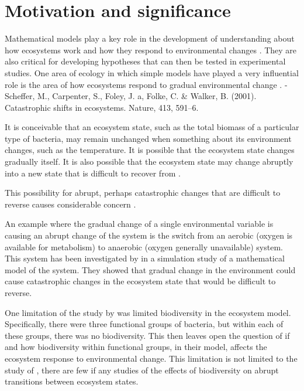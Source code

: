 \documentclass[]{elsarticle} %
\begin{document}
\hypertarget{motivation-and-significance}{%
\section{Motivation and
significance}\label{motivation-and-significance}}

Mathematical models play a key role in the development of understanding
about how ecosystems work and how they respond to environmental changes
\citep{Binzer2016a, Chaparro-Pedraza2021, Vasseur2005}. They are also
critical for developing hypotheses that can then be tested in
experimental studies. One area of ecology in which simple models have
played a very influential role is the area of how ecosystems respond to
gradual environmental change \citep{REF_NEEDED}. - Scheffer, M.,
Carpenter, S., Foley, J. a, Folke, C. \& Walker, B. (2001). Catastrophic
shifts in ecosystems. Nature, 413, 591--6.

It is conceivable that an ecosystem state, such as the total biomass of
a particular type of bacteria, may remain unchanged when something about
its environment changes, such as the temperature. It is possible that
the ecosystem state changes gradually itself. It is also possible that
the ecosystem state may change abruptly into a new state that is
difficult to recover from \citep{Scheffer2001}.

This possibility for abrupt, perhaps catastrophic changes that are
difficult to reverse causes considerable concern
\citep{Collins2021, Northrop2021, Vandermeer2019}.

An example where the gradual change of a single environmental variable
is causing an abrupt change of the system is the switch from an aerobic
(oxygen is available for metabolism) to anaerobic (oxygen generally
unavailable) system. This system has been investigated by
\citet{Bush2017} in a simulation study of a mathematical model of the
system. They showed that gradual change in the environment could cause
catastrophic changes in the ecosystem state that would be difficult to
reverse.

One limitation of the study by \citet{Bush2017} was limited biodiversity
in the ecosystem model. Specifically, there were three functional groups
of bacteria, but within each of these groups, there was no biodiversity.
This then leaves open the question of if and how biodiversity within
functional groups, in their model, affects the ecosystem response to
environmental change. This limitation is not limited to the study of
\citet{Bush2017}, there are few if any studies of the effects of
biodiversity on abrupt transitions between ecosystem states.
\end{document}
